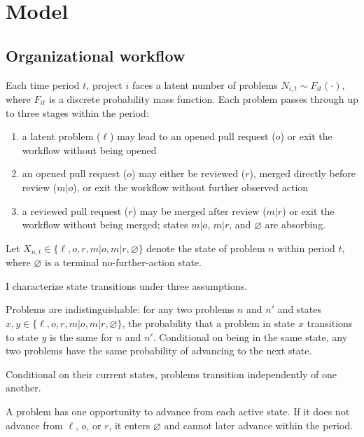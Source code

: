 \documentclass[source/paper/main.tex]{subfiles}
\begin{document}
\section{Model}
\subsection{Organizational workflow}

Each time period $t$, project $i$ faces a latent number of problems $N_{i,t} \sim F_{it}(\cdot)$, where $F_{it}$ is a discrete probability mass function.
Each problem passes through up to three stages within the period:
\begin{enumerate}
    \item a latent problem ($\ell$) may lead to an opened pull request ($o$) or exit the workflow without being opened
    \item an opened pull request ($o$) may either be reviewed ($r$), merged directly before review ($m|o$), or exit the workflow without further observed action
    \item a reviewed pull request ($r$) may be merged after review ($m|r$) or exit the workflow without being merged; states $m|o$, $m|r$, and $\varnothing$ are absorbing.
\end{enumerate}
Let $X_{n,t} \in \{\ell,o,r,m|o,m|r,\varnothing\}$ denote the state of problem $n$ within period $t$, where $\varnothing$ is a terminal no-further-action state.

I characterize state transitions under three assumptions.

\begin{assumption}
\label{asm:exchangeability}
Problems are indistinguishable: for any two problems $n$ and $n'$ and states $x,y \in \{\ell,o,r,m|o,m|r,\varnothing\}$, the probability that a problem in state $x$ transitions to state $y$ is the same for $n$ and $n'$.
Conditional on being in the same state, any two problems have the same probability of advancing to the next state.
\end{assumption}

\begin{assumption}
\label{asm:independence}
Conditional on their current states, problems transition independently of one another.
\end{assumption}

\begin{assumption}
\label{asm:one-shot}
A problem has one opportunity to advance from each active state.
If it does not advance from $\ell$, $o$, or $r$, it enters $\varnothing$ and cannot later advance within the period.
\end{assumption}
\end{document}
